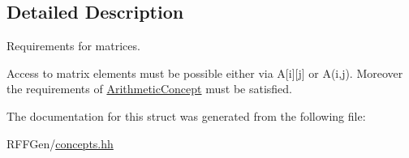 \subsection{Detailed Description}
Requirements for matrices. 

Access to matrix elements must be possible either via A\mbox{[}i\mbox{]}\mbox{[}j\mbox{]} or A(i,j). Moreover the requirements of \hyperlink{structRFFGen_1_1Concepts_1_1ArithmeticConcept}{Arithmetic\-Concept} must be satisfied. 

The documentation for this struct was generated from the following file\-:\begin{DoxyCompactItemize}
\item 
R\-F\-F\-Gen/\hyperlink{concepts_8hh}{concepts.\-hh}\end{DoxyCompactItemize}
